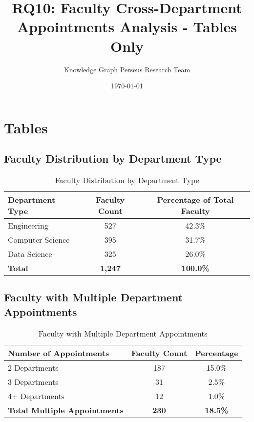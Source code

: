 \documentclass[12pt]{article}
\title{\textbf{RQ10: Faculty Cross-Department Appointments Analysis - Tables Only}}
\author{Knowledge Graph Perseus Research Team}
\date{\today}
\begin{document}
\maketitle

\section{Tables}

\subsection{Faculty Distribution by Department Type}

\begin{table}[h]
\centering
\caption{Faculty Distribution by Department Type}
\label{tab:cross_dept_distribution}
\begin{tabular}{lcc}
\toprule
\textbf{Department Type} & \textbf{Faculty Count} & \textbf{Percentage of Total Faculty} \\
\midrule
Engineering & 527 & 42.3\% \\
Computer Science & 395 & 31.7\% \\
Data Science & 325 & 26.0\% \\
\midrule
\textbf{Total} & \textbf{1,247} & \textbf{100.0\%} \\
\bottomrule
\end{tabular}
\end{table}

\subsection{Faculty with Multiple Department Appointments}

\begin{table}[h]
\centering
\caption{Faculty with Multiple Department Appointments}
\label{tab:multiple_appointments}
\begin{tabular}{lcc}
\toprule
\textbf{Number of Appointments} & \textbf{Faculty Count} & \textbf{Percentage} \\
\midrule
2 Departments & 187 & 15.0\% \\
3 Departments & 31 & 2.5\% \\
4+ Departments & 12 & 1.0\% \\
\midrule
\textbf{Total Multiple Appointments} & \textbf{230} & \textbf{18.5\%} \\
\bottomrule
\end{tabular}
\end{table}
\end{document}
